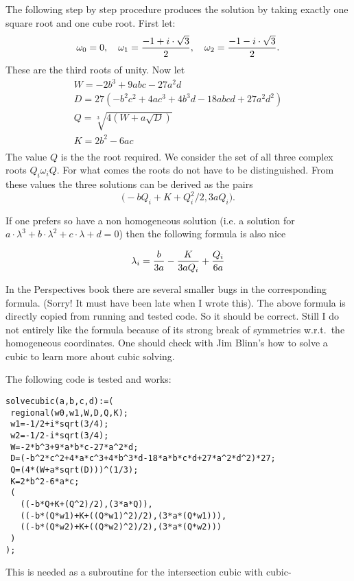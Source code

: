 \documentclass[11pt]{article}
\newcounter{subsubsubsection}[subsubsection]
\begin{document}
\medskip
{}
The following step by step procedure produces the solution by taking exactly one square root and one cube root.
First let:
\[
 \omega_0=0,\quad
 \omega_1={-1+i\cdot \sqrt{3}\over 2},\quad
 \omega_2={-1-i\cdot \sqrt{3}\over 2}. 
\]
These are the third roots of unity. Now let
\[
\begin{array}{l}
 W=-2b^3+9abc-27a^2d\\[1mm]
 D=27(-b^2c^2+4ac^3+4b^3d-18abcd+27a^2d^2)\\[1mm]
 Q=\sqrt[3]{4(W+a\sqrt{D})}\\[2mm]
 K=2b^2-6ac\\
\end{array}
\]
The value $Q$ is the the root required. We consider the set of all three complex roots $Q_i\omega_iQ$.
For what comes the roots do not have to be distinguished.
\medskip\noindent
From these values the three solutions can be derived as
the pairs
\[\big(-bQ_i+K+Q_i^2/2,3aQ_i\big).\]

If one prefers so have a non homogeneous solution (i.e. a solution for
$a\cdot\lambda^3+
b\cdot\lambda^2+
c\cdot\lambda+
d=0$) then the following formula is also nice

\[
\lambda_i={b\over3 a} - { K\over3 a Q_i} + {Q_i \over 6 a }
\]

\medskip
{}
In the Perspectives book there are several smaller bugs in the corresponding formula. (Sorry! It must have been late when I wrote this).
The above formula is directly copied from running and tested code. So it should be correct.
Still I do not entirely like the formula because of its strong break of symmetries w.r.t.\ the homogeneous coordinates.
One should check with Jim Blinn's how to solve a cubic to learn more about cubic solving.

\medskip
{}
The following code is tested and works:

\begin{verbatim}
solvecubic(a,b,c,d):=(
 regional(w0,w1,W,D,Q,K);
 w1=-1/2+i*sqrt(3/4);
 w2=-1/2-i*sqrt(3/4); 
 W=-2*b^3+9*a*b*c-27*a^2*d;
 D=(-b^2*c^2+4*a*c^3+4*b^3*d-18*a*b*c*d+27*a^2*d^2)*27;
 Q=(4*(W+a*sqrt(D)))^(1/3);
 K=2*b^2-6*a*c;
 ( 
   ((-b*Q+K+(Q^2)/2),(3*a*Q)),
   ((-b*(Q*w1)+K+((Q*w1)^2)/2),(3*a*(Q*w1))),
   ((-b*(Q*w2)+K+((Q*w2)^2)/2),(3*a*(Q*w2)))
 )
);
\end{verbatim}


\medskip
{}
This is needed as a subroutine for the intersection cubic with cubic-
 
\end{document}
